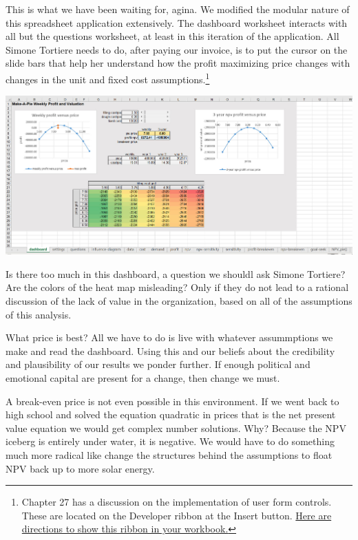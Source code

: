 \documentclass[
]{book}
\begin{document}
This is what we have been waiting for, agina. We modified the modular nature of this spreadsheet application extensively. The dashboard worksheet interacts with all but the questions worksheet, at least in this iteration of the application. All Simone Tortiere needs to do, after paying our invoice, is to put the cursor on the slide bars that help her understand how the profit maximizing price changes with changes in the unit and fixed cost assumptions.\footnote{\citet{Winston2019} Chapter 27 has a discussion on the implementation of user form controls. These are located on the Developer ribbon at the Insert button. \href{https://support.microsoft.com/en-us/topic/show-the-developer-tab-e1192344-5e56-4d45-931b-e5fd9bea2d45}{Here are directions to show this ribbon in your workbook.}}

\includegraphics{images/02/pie-dashboard-all.jpg}

Is there too much in this dashboard, a question we shouldl ask Simone Tortiere? Are the colors of the heat map misleading? Only if they do not lead to a rational discussion of the lack of value in the organization, based on all of the assumptions of this analysis.

What price is best? All we have to do is live with whatever assummptions we make and read the dashboard. Using this and our beliefs about the credibility and plausibility of our results we ponder further. If enough political and emotional capital are present for a change, then change we must.

A break-even price is not even possible in this environment. If we went back to high school and solved the equation quadratic in prices that is the net present value equation we would get complex number solutions. Why? Because the NPV iceberg is entirely under water, it is negative. We would have to do something much more radical like change the structures behind the assumptions to float NPV back up to more solar energy.
\end{document}

